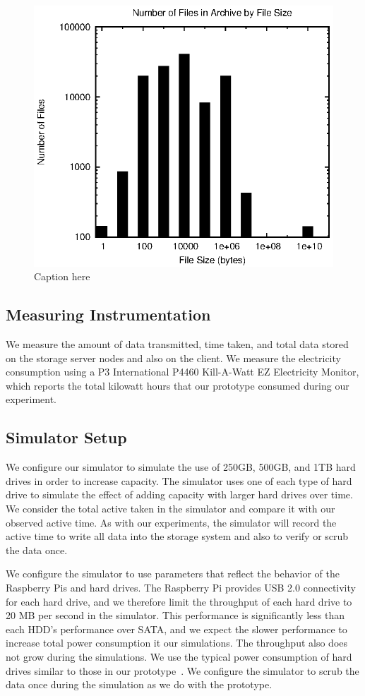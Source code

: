 \begin{figure}[!ht]
\includegraphics[width=\linewidth]{fig5.eps}
\caption{Caption here}
\label{fig5}
\end{figure}

\subsection{Measuring Instrumentation}
We measure the amount of data transmitted, time taken, and total data stored on the storage server nodes and also on the client.  We measure the electricity consumption using a  P3 International P4460 Kill-A-Watt EZ Electricity Monitor, which reports the total kilowatt hours that our prototype consumed during our experiment.

\subsection{Simulator Setup}
We configure our simulator to simulate the use of 250GB, 500GB, and 1TB hard drives in order to increase capacity.  The simulator uses one of each type of hard drive to simulate the effect of adding capacity with larger hard drives over time.  We consider the total active taken in the simulator and compare it with our observed active time.  As with our experiments, the simulator will record the active time to write all data into the storage system and also to verify or scrub the data once.

We configure the simulator to use parameters that reflect the behavior of the Raspberry Pis and hard drives.  The Raspberry Pi provides USB 2.0 connectivity for each hard drive, and we therefore limit the throughput of each hard drive to 20 MB per second in the simulator.  This performance is significantly less than each HDD’s performance over SATA, and we expect the slower performance to increase total power consumption it our simulations.  The throughput also does not grow during the simulations.  We use the typical power consumption of hard drives similar to those in our prototype~\cite{web50,web38}.  We configure the simulator to scrub the data once during the simulation as we do with the prototype.


